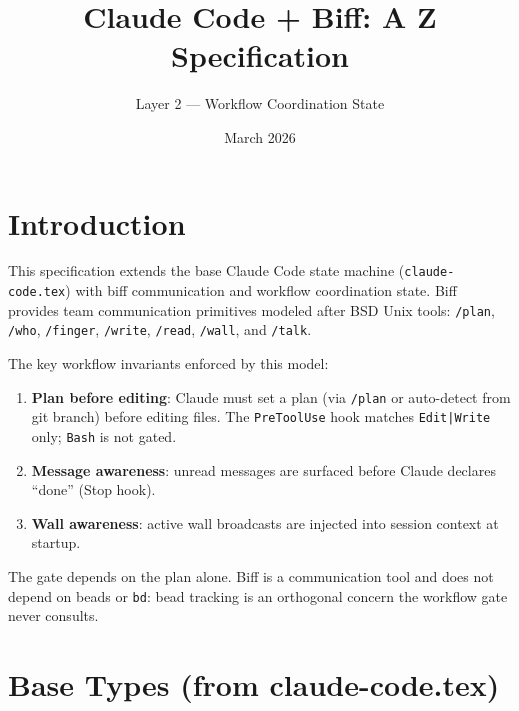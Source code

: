 \documentclass[a4paper,10pt,fleqn]{article}
\begin{document}
\title{Claude Code + Biff: A Z Specification}
\author{Layer 2 --- Workflow Coordination State}
\date{March 2026}
\maketitle

\tableofcontents
\newpage

\section{Introduction}

This specification extends the base Claude Code state machine
(\texttt{claude-code.tex}) with biff communication and workflow
coordination state. Biff provides team communication primitives
modeled after BSD Unix tools: \texttt{/plan}, \texttt{/who},
\texttt{/finger}, \texttt{/write}, \texttt{/read}, \texttt{/wall},
and \texttt{/talk}.

The key workflow invariants enforced by this model:

\begin{enumerate}
  \item \textbf{Plan before editing}: Claude must set a plan (via
    \texttt{/plan} or auto-detect from git branch) before editing
    files. The \texttt{PreToolUse} hook matches \texttt{Edit|Write}
    only; \texttt{Bash} is not gated.
  \item \textbf{Message awareness}: unread messages are surfaced
    before Claude declares ``done'' (Stop hook).
  \item \textbf{Wall awareness}: active wall broadcasts are injected
    into session context at startup.
\end{enumerate}

The gate depends on the plan alone. Biff is a communication tool and
does not depend on beads or \texttt{bd}: bead tracking is an orthogonal
concern the workflow gate never consults.

\section{Base Types (from claude-code.tex)}
\end{document}
